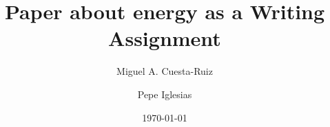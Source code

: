 \documentclass[a4paper,10pt]{elsarticle}
\date{\today}
\begin{document}
\title{Paper about energy as a Writing Assignment}
\author{Miguel A. Cuesta-Ruiz}
\author{Pepe Iglesias} %






%
\end{document}
